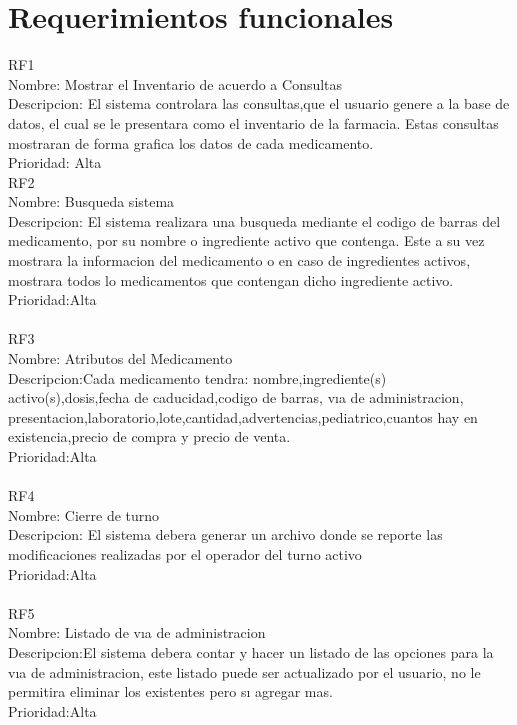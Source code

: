 \section{Requerimientos funcionales}
RF1\\
Nombre: Mostrar el Inventario de acuerdo a Consultas\\
Descripcion: El sistema controlara las consultas,que el usuario genere a la base de datos, el
cual se le presentara como el inventario de la farmacia. Estas consultas mostraran de forma
grafica los datos de cada medicamento.\\
Prioridad: Alta\\
\newpage
RF2\\
Nombre: Busqueda sistema\\
Descripcion: El sistema realizara una busqueda mediante el codigo de barras del medicamento,
por su nombre o ingrediente activo que contenga. Este a su vez mostrara la informacion
del medicamento o en caso de ingredientes activos, mostrara todos lo medicamentos que contengan
dicho ingrediente activo.\\
Prioridad:Alta\\
\\
RF3\\
Nombre: Atributos del Medicamento\\
Descripcion:Cada medicamento tendra: nombre,ingrediente(s) activo(s),dosis,fecha de caducidad,codigo
de barras, vıa de administracion, presentacion,laboratorio,lote,cantidad,advertencias,pediatrico,cuantos
hay en existencia,precio de compra y precio de venta.\\
Prioridad:Alta\\
\\
RF4\\
Nombre: Cierre de turno\\
Descripcion: El sistema debera generar un archivo donde se reporte las modificaciones realizadas
por el operador del turno activo\\
Prioridad:Alta\\
\\
RF5\\
Nombre: Listado de vıa de administracion\\
Descripcion:El sistema debera contar y hacer un listado de las opciones para la vıa de administracion,
este listado puede ser actualizado por el usuario, no le permitira eliminar los
existentes pero sı agregar mas.\\
Prioridad:Alta\\
\\

